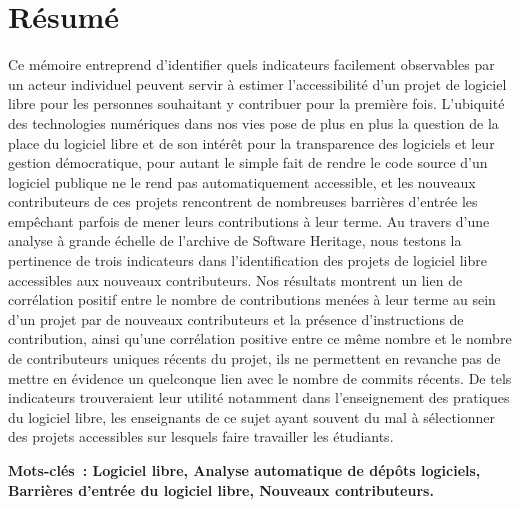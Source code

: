 

\printbibliography[heading=bibintoc, prenote=bibnote]

\printindex

\printglossary

\pagebreak

\section*{Résumé}

Ce mémoire entreprend d'identifier quels indicateurs facilement observables par un acteur individuel peuvent
servir à estimer l'accessibilité d'un projet de logiciel libre pour les personnes souhaitant y contribuer pour
la première fois. L'ubiquité des technologies numériques dans nos vies pose de plus en plus la question de la
place du logiciel libre et de son intérêt pour la transparence des logiciels et leur gestion démocratique,
pour autant le simple fait de rendre le code source d'un logiciel publique ne le rend pas automatiquement
accessible, et les nouveaux contributeurs de ces projets rencontrent de nombreuses barrières d'entrée les
empêchant parfois de mener leurs contributions à leur terme. Au travers d'une analyse à grande échelle de
l'archive de Software Heritage, nous testons la pertinence de trois indicateurs dans l'identification des
projets de logiciel libre accessibles aux nouveaux contributeurs. Nos résultats montrent un lien de
corrélation positif entre le nombre de contributions menées à leur terme au sein d'un projet par de nouveaux
contributeurs et la présence d'instructions de contribution, ainsi qu'une corrélation positive entre ce même
nombre et le nombre de contributeurs uniques récents du projet, ils ne permettent en revanche pas de mettre en
évidence un quelconque lien avec le nombre de \glspl{commit} récents. De tels indicateurs trouveraient leur
utilité notamment dans l'enseignement des pratiques du logiciel libre, les enseignants de ce sujet ayant
souvent du mal à sélectionner des projets accessibles sur lesquels faire travailler les étudiants.

\textbf{%
    Mots-clés : Logiciel libre, Analyse automatique de dépôts logiciels, Barrières d'entrée du logiciel libre,
    Nouveaux contributeurs.
}

